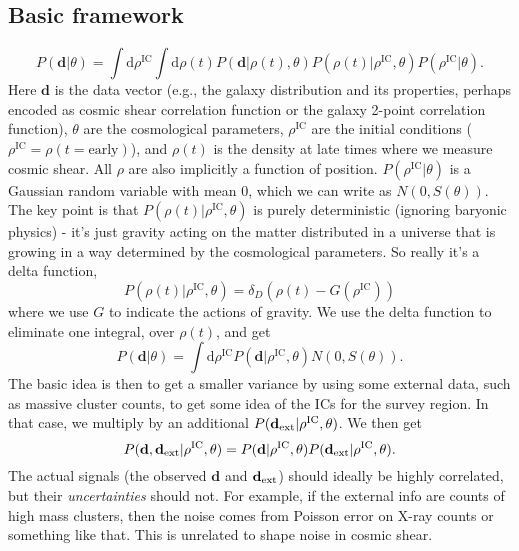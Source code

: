 \documentclass[preprint]{aastex}
\newcommand{\data}{\mathbf{d}}
\newcommand{\dataext}{\data_{\rm ext}}
\begin{document}
\subsection{Basic framework}
\begin{equation}
	P(\data|\theta) = \int \mathrm{d}\rho^\text{IC}\int \mathrm{d}\rho(t) P(\data|\rho(t),\theta)
	P(\rho(t)|\rho^\text{IC},\theta) P(\rho^\text{IC}|\theta).
\end{equation}
Here $\data$ is the data vector (e.g., the galaxy distribution and its properties, perhaps encoded
as cosmic shear correlation function or the galaxy 2-point
correlation function), $\theta$ are the cosmological parameters, $\rho^\text{IC}$ are the initial
conditions ($\rho^\text{IC}=\rho(t=\text{early})$), and $\rho(t)$ is the density at late times where we measure cosmic
shear.  All $\rho$ are also implicitly a function of position.
$P(\rho^\text{IC}|\theta)$ is a Gaussian random variable with mean $0$, which we can write as $N(0,S(\theta))$.  The key point is that
$P(\rho(t)|\rho^\text{IC},\theta)$ is purely deterministic (ignoring baryonic physics) - it's just
gravity acting on the matter distributed in a universe that is growing in a way determined by the
cosmological parameters.  So really it's a delta function,
\begin{equation}
	P(\rho(t)|\rho^\text{IC},\theta) = \delta_D(\rho(t)-G(\rho^\text{IC}))
\end{equation} 
where we use $G$ to indicate the actions of gravity.  We use the delta function to eliminate one
integral, over $\rho(t)$, and get
\begin{equation}
	P(\data|\theta) = \int \mathrm{d}\rho^\text{IC}  P(\data|\rho^\text{IC},\theta)N(0,S(\theta)).
\end{equation}
The basic idea is then to get a smaller variance by using some external data, such as massive
cluster counts, to get some idea of the ICs for the survey region.  In that case, we multiply by an
additional $P(\dataext|\rho^\text{IC},\theta)$.  We then get
\begin{equation}
	P(\data,\dataext|\rho^\text{IC},\theta) = P(\data|\rho^\text{IC},\theta)P(\dataext|\rho^\text{IC},\theta).
\end{equation}
The actual signals (the observed $\data$ and $\dataext$) should ideally be highly
correlated, but their {\em uncertainties} should not.  For example, if the external info are counts
of high mass clusters, then the noise comes from Poisson error on X-ray counts or something like
that.  This is unrelated to shape noise in cosmic shear.
\end{document}
